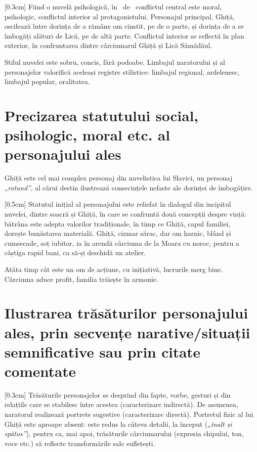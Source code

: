 [0.3cm]
Fiind o nuvelă psihologică, în \operatitle\ de \operaauthor\ conflictul central este moral, psihologic, conflictul interior al protagonistului. Personajul principal, Ghiță, oscilează între dorința de a rămâne om cinstit, pe de o parte, și dorința de a se îmbogăți alături de Lică, pe de altă parte. Conflictul interior se reflectă în plan exterior, în confruntarea dintre cârciumarul Ghiță și Lică Sămădăul.

Stilul nuvelei este sobru, concis, fără podoabe. Limbajul naratorului și al personajelor valorifică aceleași registre stilistice: limbajul regional, ardelenesc, limbajul popular, oralitatea.


\section{Precizarea statutului social, psihologic, moral etc. al personajului ales}

Ghiță este cel mai complex personaj din nuvelistica lui Slavici, un personaj \textit{„rotund”}, al cărui destin ilustrează consecințele nefaste ale dorinței de îmbogățire.

[0.5cm]
Statutul inițial al personajului este reliefat în dialogul din incipitul nuvelei, dintre soacră și Ghiță, în care se confruntă două concepții despre viață: bătrâna este adepta valorilor tradiționale, în timp ce Ghiță, capul familiei, dorește bunăstarea materială. Ghiță, cizmar sărac, dar om harnic, blând și cumsecade, soț iubitor, ia în arendă cârciuma de la Moara cu noroc, pentru a câștiga rapid bani, ca să-și deschidă un atelier.

Atâta timp cât este un om de acțiune, cu inițiativă, lucrurile merg bine. Cârciuma aduce profit, familia trăiește în armonie.


\section{Ilustrarea trăsăturilor personajului ales, prin secvențe narative/situații semnificative sau prin citate comentate}

[0.3cm]
Trăsăturile personajelor se desprind din fapte, vorbe, gesturi și din relațiile care se stabilesc între acestea (caracterizare indirectă). De asemenea, naratorul realizează portrete sugestive (caracterizare directă). Portretul fizic al lui Ghiță este aproape absent: este redus la câteva detalii, la început (\textit{„înalt și spătos”}), pentru ca, mai apoi, trăsăturile cârciumarului (expresia chipului, ton, voce etc.) să reflecte transformările sale sufletești.


